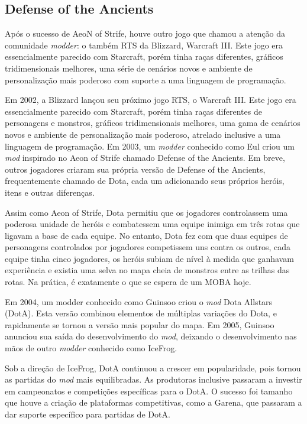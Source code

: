 \subsection{Defense of the Ancients}
Após o sucesso de AeoN of Strife, houve outro jogo que chamou a atenção da comunidade \textit{modder}: o também RTS da Blizzard, Warcraft III. Este jogo era essencialmente parecido com Starcraft, porém tinha raças diferentes, gráficos tridimensionais melhores, uma série de cenários novos e ambiente de personalização mais poderoso com suporte a uma linguagem de programação.

Em 2002, a Blizzard lançou seu próximo jogo RTS, o Warcraft III. Este jogo era essencialmente parecido com Starcraft, porém tinha raças diferentes de personagens e monstros, gráficos tridimensionais melhores, uma gama de cenários novos e ambiente de personalização mais poderoso, atrelado inclusive a uma linguagem de programação. Em 2003, um \textit{modder} conhecido como Eul criou um \textit{mod} inspirado no Aeon of Strife chamado Defense of the Ancients. Em breve, outros jogadores criaram sua própria versão de Defense of the Ancients, frequentemente chamado de Dota, cada um adicionando seus próprios heróis, itens e outras diferenças.

Assim como Aeon of Strife, Dota permitiu que os jogadores controlassem uma poderosa unidade de heróis e combatessem uma equipe inimiga em três rotas que ligavam a base de cada equipe. No entanto, Dota fez com que duas equipes de personagens controlados por jogadores competissem uns contra os outros, cada equipe tinha cinco jogadores, os heróis subiam de nível à medida que ganhavam experiência e existia uma selva no mapa cheia de monstros entre as trilhas das rotas. Na prática, é exatamente o que se espera de um MOBA hoje.

Em 2004, um modder conhecido como Guinsoo criou o \textit{mod} Dota Allstars (DotA). Esta versão combinou elementos de múltiplas variações do Dota, e rapidamente se tornou a versão mais popular do mapa. Em 2005, Guinsoo anunciou sua saída do desenvolvimento do \textit{mod}, deixando o desenvolvimento nas mãos de outro \textit{modder} conhecido como IceFrog.

Sob a direção de IceFrog, DotA continuou a crescer em popularidade, pois tornou as partidas do \textit{mod} mais equilibradas. As produtoras inclusive passaram a investir em campeonatos e competições específicas para o DotA. O sucesso foi tamanho que houve a criação de plataformas competitivas, como a Garena, que passaram a dar suporte específico para partidas de DotA.

